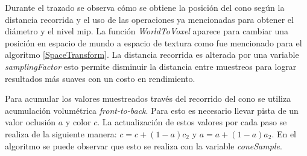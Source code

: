 Durante el trazado se observa cómo se obtiene la posición del cono según la distancia recorrida y el uso de las operaciones ya mencionadas para obtener el diámetro y el nivel mip. La función \emph{WorldToVoxel} aparece para cambiar una posición en espacio de mundo a espacio de textura como fue mencionado para el algoritmo \ref{SpaceTransform}. La distancia recorrida es alterada por una variable \emph{samplingFactor} esto permite disminuir la distancia entre muestreos para lograr resultados más suaves con un costo en rendimiento.

Para acumular los valores muestreados través del recorrido del cono se utiliza acumulación volumétrica \emph{front-to-back}. Para esto es necesario llevar pista de un valor oclusión $a$ y color $c$. La actualización de estos valores por cada paso se realiza de la siguiente manera: $c=c+(1-a)c_2$ y $a=a+(1-a)a_2$. En el algoritmo se puede observar que esto se realiza con la variable \emph{coneSample}.

